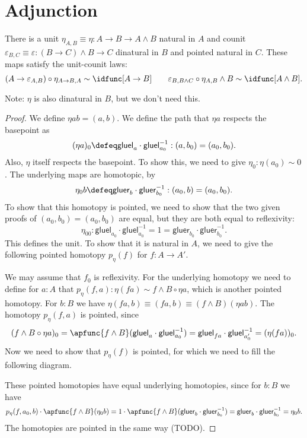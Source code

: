 \documentclass{article}
\newcommand{\pmap}{\to}
\newcommand{\smsh}{\wedge}
\renewcommand{\epsilon}{\varepsilon}
\newcommand{\tr}{\cdot}
\renewcommand{\o}{\ensuremath{\circ}}
\newcommand{\gluel}{\mathsf{gluel}}
\newcommand{\gluer}{\mathsf{gluer}}
\newcommand{\sy}{^{-1}}
\begin{document}
\section{Adjunction}

\begin{lem}\label{lem:unit-counit}
  There is a unit $\eta_{A,B}\equiv\eta:A\pmap B\pmap A\smsh B$ natural in $A$ and counit
  $\epsilon_{B,C}\equiv\epsilon : (B\pmap C)\smsh B \pmap C$ dinatural in $B$ and pointed natural in $C$.
  These maps satisfy the unit-counit laws:
  $$(A\to\epsilon_{A,B})\o \eta_{A\to B,A}\sim \idfunc[A\to B]\qquad
  \epsilon_{B,B\smsh C}\o \eta_{A,B}\smsh B\sim\idfunc[A\smsh B].$$
\end{lem}
Note: $\eta$ is also dinatural in $B$, but we don't need this.
\begin{proof}
  We define $\eta ab=(a,b)$. We define the path that $\eta a$ respects the basepoint as
  $$(\eta a)_0\defeq\gluel_a\tr\gluel_{a_0}\sy:(a,b_0)=(a_0,b_0).$$ Also, $\eta$ itself respects the basepoint. To show this, we need to give $\eta_0:\eta (a_0)\sim 0$. The underlying maps are homotopic, by $$\eta_0b\defeq\gluer_b\cdot\gluer_{b_0}\sy:(a_0,b)=(a_0,b_0).$$ To show that
  this homotopy is pointed, we need to show that the two given proofs of $(a_0,b_0)=(a_0,b_0)$ are
  equal, but they are both equal to reflexivity:
  $$\eta_{00}:\gluel_{a_0}\tr\gluel_{a_0}\sy=1=\gluer_{b_0}\tr\gluer_{b_0}\sy.$$
  This defines the unit. To show that it is natural in $A$, we need to give the following pointed homotopy $p_\eta(f)$ for $f:A\to A'$.
  \begin{center}
  \end{center}
  We may assume that $f_0$ is reflexivity. For the underlying homotopy we need to define for $a:A$ that $p_\eta(f,a):\eta(fa)\sim f\smsh B \circ \eta a$, which is another pointed homotopy. For $b:B$ we have $\eta(fa,b)\equiv(fa,b)\equiv(f\smsh B)(\eta ab).$
  The homotopy $p_\eta(f,a)$ is pointed, since $$(f\smsh B \circ \eta a)_0=\apfunc{f\smsh B}(\gluel_a\cdot\gluel_{a_0}\sy)=\gluel_{fa}\cdot\gluel_{a_0'}\sy=(\eta(fa))_0.$$
  Now we need to show that $p_\eta(f)$ is pointed, for which we need to fill the following diagram.
  \begin{center}
  \end{center}
  These pointed homotopies have equal underlying homotopies, since for $b:B$ we have 
  $$p_\eta(f,a_0,b)\cdot\apfunc{f\smsh B}(\eta_0 b)=1\cdot\apfunc{f\smsh B}(\gluer_b\cdot\gluer_{b_0}\sy)=\gluer_{b}\cdot\gluer_{b_0}\sy=\eta_0b.$$
  The homotopies are pointed in the same way (TODO).


\end{proof}
\end{document}

